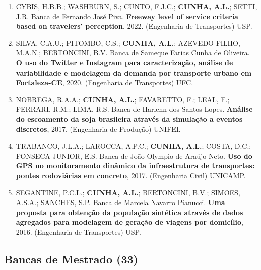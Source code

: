 \documentclass[
  brazilian,
  11pt,
  a4paper,
]{article}
\begin{document}
\begin{enumerate}
{  de Conflitos}, 2023. (Ciências da Computação e Matemática
  Computacional) USP.
\item
  CYBIS, H.B.B.; WASHBURN, S.; CUNTO, F.J.C.; \textbf{CUNHA, A.L.};
  SETTI, J.R. Banca de Fernando José Piva. \textbf{Freeway level of
  service criteria based on travelers' perception}, 2022. (Engenharia de
  Transportes) USP.
\item
  SILVA, C.A.U.; PITOMBO, C.S.; \textbf{CUNHA, A.L.}; AZEVEDO FILHO,
  M.A.N.; BERTONCINI, B.V. Banca de Sameque Farias Cunha de Oliveira.
  \textbf{O uso do Twitter e Instagram para caracterização, análise de
  variabilidade e modelagem da demanda por transporte urbano em
  Fortaleza-CE}, 2020. (Engenharia de Transportes) UFC.
\item
  NOBREGA, R.A.A.; \textbf{CUNHA, A.L.}; FAVARETTO, F.; LEAL, F.;
  FERRARI, R.M.; LIMA, R.S. Banca de Harlenn dos Santos Lopes.
  \textbf{Análise do escoamento da soja brasileira através da simulação
  a eventos discretos}, 2017. (Engenharia de Produção) UNIFEI.
\item
  TRABANCO, J.L.A.; LAROCCA, A.P.C.; \textbf{CUNHA, A.L.}; COSTA, D.C.;
  FONSECA JUNIOR, E.S. Banca de João Olympio de Araújo Neto. \textbf{Uso
  do GPS no monitoramento dinâmico da infraestrutura de transportes:
  pontes rodoviárias em concreto}, 2017. (Engenharia Civil) UNICAMP.
\item
  SEGANTINE, P.C.L.; \textbf{CUNHA, A.L.}; BERTONCINI, B.V.; SIMOES,
  A.S.A.; SANCHES, S.P. Banca de Marcela Navarro Pianucci. \textbf{Uma
  proposta para obtenção da população sintética através de dados
  agregados para modelagem de geração de viagens por domicílio}, 2016.
  (Engenharia de Transportes) USP.
\end{enumerate}

\subsection{Bancas de Mestrado (33)}\label{bancas-de-mestrado-33}
\end{document}
